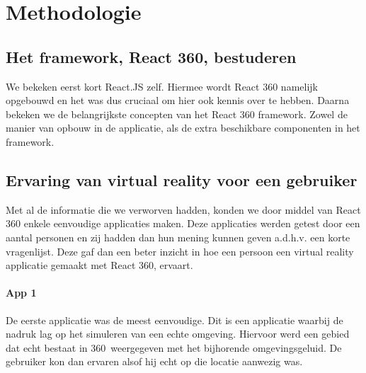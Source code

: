 
\chapter{Methodologie}
\label{ch:methodologie}


\section{Het framework, React 360, bestuderen}
\label{sec:reactvr-bestuderen}
We bekeken eerst kort React.JS zelf. Hiermee wordt React 360 namelijk opgebouwd en het was dus cruciaal om hier ook kennis over te hebben. Daarna bekeken we de belangrijkste concepten van het React 360 framework. Zowel de manier van opbouw in de applicatie, als de extra beschikbare componenten in het framework.

\section{Ervaring van virtual reality voor een gebruiker}
\label{sec:ervaring-vr-app}
Met al de informatie die we verworven hadden, konden we door middel van React 360 enkele eenvoudige applicaties maken. Deze applicaties werden getest door een aantal personen en zij hadden dan hun mening kunnen geven a.d.h.v. een korte vragenlijst. Deze gaf dan een beter inzicht in hoe een persoon een virtual reality applicatie gemaakt met React 360, ervaart.

\subsubsection{App 1}
De eerste applicatie was de meest eenvoudige. Dit is een applicatie waarbij de nadruk lag op het simuleren van een echte omgeving. Hiervoor werd een gebied dat echt bestaat in 360\textdegree\ weergegeven met het bijhorende omgevingsgeluid. De gebruiker kon dan ervaren alsof hij echt op die locatie aanwezig was.

